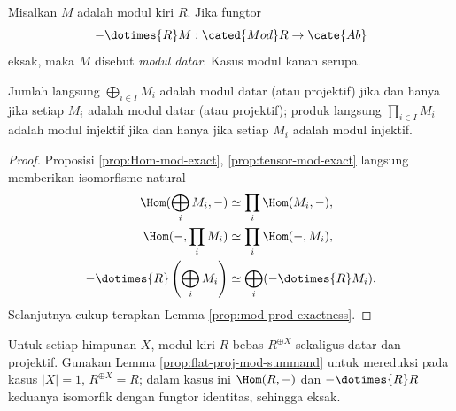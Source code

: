 \begin{definition}
	Misalkan $M$ adalah modul kiri $R$. Jika fungtor
	\[ - \dotimes{R} M: \cated{Mod}R \to \cate{Ab} \]
	eksak, maka $M$ disebut \emph{modul datar}. Kasus modul kanan serupa.
\end{definition}

\begin{lemma}\label{prop:flat-proj-mod-summand}
	Jumlah langsung $\bigoplus_{i \in I} M_i$ adalah modul datar (atau projektif) jika dan hanya jika setiap $M_i$ adalah modul datar (atau projektif); produk langsung $\prod_{i \in I} M_i$ adalah modul injektif jika dan hanya jika setiap $M_i$ adalah modul injektif.
\end{lemma}
\begin{proof}
	Proposisi \ref{prop:Hom-mod-exact}, \ref{prop:tensor-mod-exact} langsung memberikan isomorfisme natural
	\begin{align*}
		\Hom(\bigoplus_i M_i, -) & \simeq \prod_i \Hom(M_i, -), \\
		\Hom(-, \prod_i M_i) & \simeq \prod_i \Hom(-, M_i), \\
		- \dotimes{R} \left( \bigoplus_i M_i \right) & \simeq \bigoplus_i (- \dotimes{R} M_i).
	\end{align*}
	Selanjutnya cukup terapkan Lemma \ref{prop:mod-prod-exactness}.
\end{proof}

\begin{example}\label{eg:flat-proj-freemod}
	Untuk setiap himpunan $X$, modul kiri $R$ bebas $R^{\oplus X}$ sekaligus datar dan projektif. Gunakan Lemma \ref{prop:flat-proj-mod-summand} untuk mereduksi pada kasus $|X|=1$, $R^{\oplus X} = R$; dalam kasus ini $\Hom(R,-)$ dan $- \dotimes{R} R$ keduanya isomorfik dengan fungtor identitas, sehingga eksak.
\end{example}

